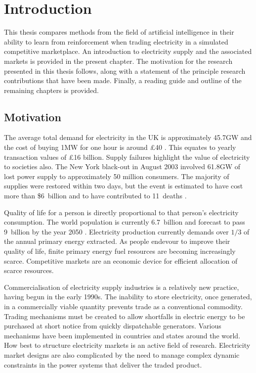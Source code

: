 \chapter{Introduction}
This thesis compares methods from the field of artificial intelligence in their
ability to learn from reinforcement when trading electricity in a simulated
competitive marketplace.  An introduction to electricity supply and the
associated markets is provided in the present chapter.  The motivation for the
research presented in this thesis follows, along with a statement of the
principle research contributions that have been made.  Finally, a reading guide
and outline of the remaining chapters is provided.

\section{Motivation}
The average total demand for electricity in the UK is approximately 45.7GW and
the cost of buying 1MW for one hour is around \pounds40 \cite{decc:dukes09}.
This equates to yearly transaction values of \pounds16 billion.  Supply
failures highlight the value of electricity to societies also.  The New York
black-out in August 2003 involved 61.8GW of lost power supply to approximately
50 million consumers. The majority of supplies were restored within two days,
but the event is estimated to have cost more than \$6~billion and to have
contributed to 11~deaths \cite{minkel:2008,icf:2003}.

Quality of life for a person is directly proportional to that person's
electricity consumption\cite{alam:qol}.  The world population is currently
6.7~billion and forecast to pass 9~billion by the year 2050 \cite{un:pop}.
Electricity production currently demands over $1/3$ of the annual primary energy extracted. As people endevour to improve their quality of life,
finite primary energy fuel resources are becoming increasingly scarce.
Competitive markets are an economic device for efficient allocation of scarce
resources.

Commercialisation of electricity supply industries is a relatively new
practice, having begun in the early 1990s.  The inability to store electricity,
once generated, in a commercially viable quantity prevents trade as a
conventional commodity.  Trading mechanisms must be created to allow shortfalls
in electric energy to be purchased at short notice from quickly dispatchable
generators.  Various mechanisms have been implemented in countries and states
around the world.  How best to structure electricity markets is an active field
of research.  Electricity market designs are also complicated by the need to
manage complex dynamic constraints in the power systems that deliver the traded
product.


